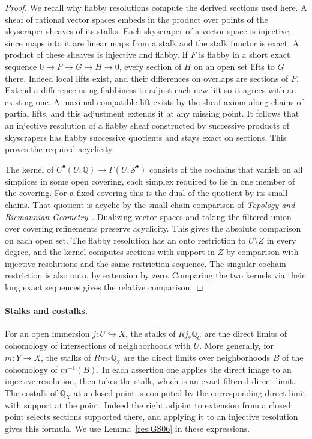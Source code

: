 \documentclass[11pt,oneside,openany]{book}
\theoremstyle{definition}
\theoremstyle{remark}
\begin{document}
\begin{proof}
We recall why flabby resolutions compute the derived
sections used here. A sheaf of rational vector spaces embeds
in the product over points of the skyscraper sheaves of
its stalks. Each skyscraper of a vector space is injective,
since maps into it are linear maps from a stalk and the
stalk functor is exact. A product of these sheaves is
injective and flabby. If \(F\) is flabby in a short exact
sequence \(0\to F\to G\to H\to0\), every section of \(H\)
on an open set lifts to \(G\) there. Indeed local lifts
exist, and their differences on overlaps are sections of
\(F\). Extend a difference using flabbiness to adjust each
new lift so it agrees with an existing one. A maximal
compatible lift exists by the sheaf axiom along chains
of partial lifts, and this adjustment extends it at any
missing point. It follows that an injective resolution of
a flabby sheaf constructed by successive products of
skyscrapers has flabby successive quotients and stays exact
on sections. This proves the required acyclicity.

The kernel of \(C^\bullet(U;\mathbb Q)\to
\Gamma(U,\mathcal S^\bullet)\) consists of the cochains that
vanish on all simplices in some open covering, each
simplex required to lie in one member of the covering.
For a fixed covering this is the dual of the quotient by
its small chains. That quotient is acyclic by the
small-chain comparison of \emph{Topology and Riemannian
Geometry}~\cite[Theorem 3.8, PDF p.~19]{mg-topriem}.
Dualizing vector spaces and taking the filtered union over
covering refinements preserve acyclicity. This gives the
absolute comparison on each open set. The flabby resolution
has an onto restriction to \(U\setminus Z\) in every degree,
and the kernel computes sections with support in \(Z\)
by comparison with injective resolutions and the same
restriction sequence. The singular cochain restriction is
also onto, by extension by zero. Comparing the two kernels
via their long exact sequences gives the relative comparison.
\end{proof}

\paragraph{Stalks and costalks.}
For an open immersion \(j:U\hookrightarrow X\), the stalks
of \(Rj_*\mathbb Q_U\) are the direct limits of cohomology of
intersections of neighborhoods with \(U\). More generally,
for \(m:Y\to X\), the stalks of \(Rm_*\mathbb Q_Y\) are the
direct limits over neighborhoods \(B\) of the cohomology of
\(m^{-1}(B)\). In each assertion one applies the direct image
to an injective resolution, then takes the stalk, which is
an exact filtered direct limit. The costalk of \(\mathbb Q_X\)
at a closed point is computed by the corresponding direct
limit with support at the point. Indeed the right adjoint
to extension from a closed point selects sections supported
there, and applying it to an injective resolution gives
this formula. We use Lemma~\ref{res:GS06} in these expressions.
\end{document}
